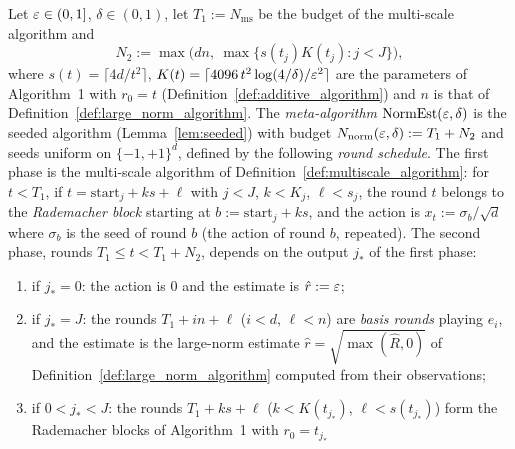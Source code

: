\begin{definition}\label{def:meta_algorithm}
\leanok
{}
Let $\varepsilon \in (0,1]$, $\delta \in (0,1)$, let $T_1 := N_{\mathrm{ms}}$ be the budget of the
multi-scale algorithm and
\[
  N_2 := \max\big( dn,\ \max\{ s(t_j)K(t_j) : j < J \} \big),
\]
where $s(t) = \lceil 4d/t^2\rceil$, $K(t) = \lceil 4096\,t^2\log(4/\delta)/\varepsilon^2\rceil$ are the
parameters of Algorithm~1 with $r_0 = t$ (Definition~\ref{def:additive_algorithm}) and $n$
is that of Definition~\ref{def:large_norm_algorithm}. The \emph{meta-algorithm}
$\mathrm{NormEst}(\varepsilon,\delta)$ is the seeded algorithm (Lemma~\ref{lem:seeded}) with budget
$N_{\mathrm{norm}}(\varepsilon,\delta) := T_1 + N_2$ and seeds uniform on $\{-1,+1\}^d$, defined by the
following \emph{round schedule}. The first phase is the multi-scale algorithm of
Definition~\ref{def:multiscale_algorithm}: for $t < T_1$, if $t = \mathrm{start}_j + ks + \ell$
with $j < J$, $k < K_j$, $\ell < s_j$, the round $t$ belongs to the \emph{Rademacher block}
starting at $b := \mathrm{start}_j + ks$, and the action is $x_t := \sigma_b/\sqrt d$ where
$\sigma_b$ is the seed of round $b$ (the action of round $b$, repeated). The second phase,
rounds $T_1 \le t < T_1 + N_2$, depends on the output $j_*$ of the first phase:
\begin{enumerate}
  \item[(a)] if $j_* = 0$: the action is $0$ and the estimate is $\hat r := \varepsilon$;
  \item[(b)] if $j_* = J$: the rounds $T_1 + in + \ell$ ($i < d$, $\ell < n$) are
        \emph{basis rounds} playing $e_i$, and the estimate is the large-norm estimate
        $\hat r = \sqrt{\max(\hat R, 0)}$ of Definition~\ref{def:large_norm_algorithm} computed
        from their observations;
  \item[(c)] if $0 < j_* < J$: the rounds $T_1 + ks + \ell$ ($k < K(t_{j_*})$,
        $\ell < s(t_{j_*})$) form the Rademacher blocks of Algorithm~1 with $r_0 = t_{j_*}$

\end{enumerate}
\end{definition}
